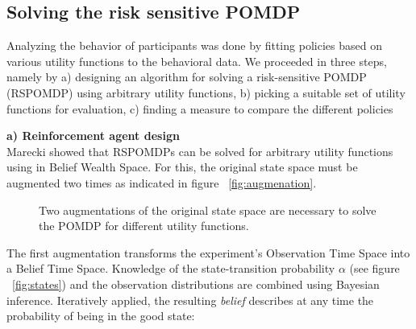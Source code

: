 
\subsection{Solving the risk sensitive POMDP}

Analyzing the behavior of participants was done by fitting policies based on various utility functions to the behavioral data.
We proceeded in three steps, namely by
a) designing an algorithm for solving a risk-sensitive POMDP (RSPOMDP) using arbitrary utility functions,
b) picking a suitable set of utility functions for evaluation,
c) finding a measure to compare the different policies

\textbf{a) Reinforcement agent design}\\
Marecki \cite{marecki} showed that RSPOMDPs can be solved for arbitrary utility functions using  in Belief Wealth Space.
For this, the original state space must be augmented two times as indicated in figure ~\autoref{fig:augmenation}.
\begin{figure}[H]
\begin {center}
\end{center}
\caption{Two augmentations of the original state space are necessary to solve the POMDP for different utility functions.}\label{fig:augmenation}
\end{figure}

The first augmentation transforms the experiment's Observation Time Space into a Belief Time Space. Knowledge of the state-transition probability $\alpha$ (see figure ~\autoref{fig:states}) and the observation distributions are combined using Bayesian inference. Iteratively applied, the resulting \textit{belief} describes at any time the probability of being in the good state:

